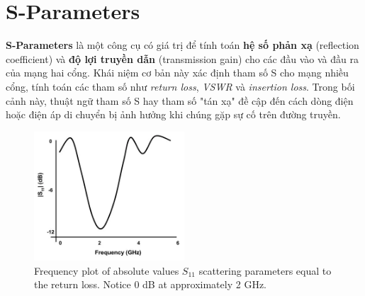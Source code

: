 \chapter{S-Parameters}
    \textbf{S-Parameters} là một công cụ có giá trị để tính toán 
    \textbf{hệ số phản xạ} (reflection coefficient) và \textbf{độ lợi truyền dẫn} (transmission gain)
    cho các đầu vào và đầu ra của mạng hai cổng. 
    Khái niệm cơ bản này xác định tham số S cho 
    mạng nhiều cổng, tính toán các tham số như 
    \textit{return loss}, \textit{VSWR} và 
    \textit{insertion loss}. 
    Trong bối cảnh này, thuật ngữ tham số S hay 
    tham số "tán xạ" đề cập đến cách dòng điện hoặc 
    điện áp di chuyển bị ảnh hưởng khi chúng gặp sự 
    cố trên đường truyền.
    
    \begin{figure}[h]
        \centering
        \includegraphics[width=0.5\textwidth]{figures/freq_plot.png}
        \caption{Frequency plot of absolute values $S_{11}$ scattering parameters equal to the return loss. Notice 0 dB at approximately 2 GHz.}
        \label{fig:freq_plot}
    \end{figure}

